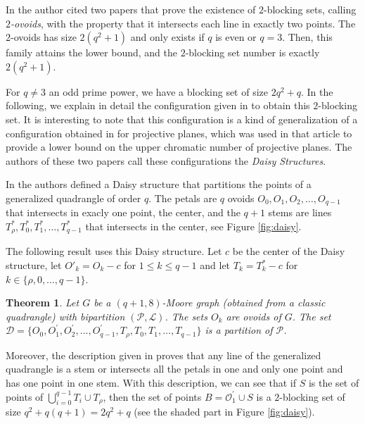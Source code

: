 \documentclass[12pt]{article}
\newtheorem{theorem}{Theorem}[section]
\begin{document}
In \cite{2ovoid} the author cited two papers \cite{Cossi,D2000} that prove the existence of $2$-blocking sets, calling {\emph {$2$-ovoids}}, with the property that it intersects each line in exactly two points. The $2$-ovoids has size $2(q^2+1)$ and only exists if $q$ is even or $q=3$. 
%
Then, this family attains the lower bound, and the $2$-blocking set number is exactly $2(q^2+1)$.

For $q\not=3$ an odd prime power, we have a blocking set of size $2q^2+q$. In the following, we explain in detail the configuration given in \cite{fmo23} to obtain this $2$-blocking set. It is interesting to note that this configuration is a kind of generalization of a configuration obtained in \cite{daisyPP} for projective planes, which was used in that article to provide a lower bound on the upper chromatic number of projective planes. The authors of these two papers call these configurations the \emph{Daisy Structures}.

In \cite{fmo23} the authors defined a Daisy structure that partitions the points of a generalized quadrangle of order $q$. The petals are $q$ ovoids $O_0, O_{1}, O_{2}, \ldots, O_{q-1}$ that intersects in exacly one point, the center,  and the $q+1$ stems are lines $T^*_\rho, T^*_0, T^*_1, \ldots, T^*_{q-1}$ that intersects in the center, see Figure \ref{fig:daisy}. 

The following result uses this Daisy structure. Let $c$ be the center of the Daisy structure, let $O'_k=O_k-c$ for $1\le k\le q-1$ and let $T_k=T^*_k-c$ for $k\in\{\rho, 0, \ldots ,{q-1}\}$.  

\begin{theorem}\cite{fmo23}\label{Teo:Daisy2}
Let $G$ be a $(q+1,8)$-Moore graph (obtained from a classic quadrangle) with bipartition $(\mathcal{P}, \mathcal{L})$. The sets $O_k$ are ovoids of $G$. The set $\mathcal{D}= \{ O_0, O^{'}_{1}, O^{'}_{2}, \ldots, O^{'}_{q-1}, T_\rho, T_0, T_1, \ldots , T_{q-1}   \}$ is a partition of $\mathcal{P}$.
\end{theorem}

Moreover, the description given in \cite{fmo23} proves that any line of the generalized quadrangle is a stem or intersects all the petals in one and only one point and has one point in one stem. With this description, we can see that if $S$ is the set of points of $\bigcup_{i=0}^{q-1} T_i \cup T_\rho$, then the set of points $B=\mathcal{O}^{'}_{1} \cup{S}$ is a $2$-blocking set of size $q^2+q(q+1)=2q^2+q$ (see the shaded part in Figure \ref{fig:daisy}). 
\end{document}
